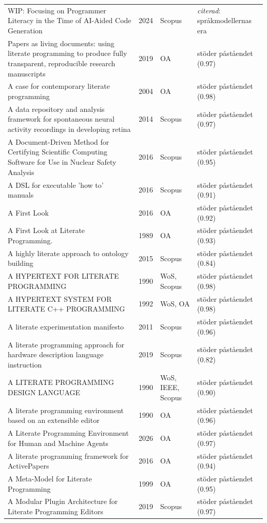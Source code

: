 \begin{longtable}{@{}%
  >{\raggedright\arraybackslash}p{}c%
  >{\raggedright\arraybackslash}p{}%
  >{\raggedright\arraybackslash}p{}@{}}
WIP: Focusing on Programmer Literacy in the Time of AI-Aided Code Generation & 2024 & Scopus & \emph{citerad}: språkmodellernas era \\
7 Papers as living documents: using literate programming to produce fully transparent, reproducible research manuscripts & 2019 & OA & stöder påståendet (0.97) \\
A case for contemporary literate programming & 2004 & OA & stöder påståendet (0.98) \\
A data repository and analysis framework for spontaneous neural activity recordings in developing retina & 2014 & Scopus & stöder påståendet (0.97) \\
A Document-Driven Method for Certifying Scientific Computing Software for Use in Nuclear Safety Analysis & 2016 & Scopus & stöder påståendet (0.95) \\
A DSL for executable 'how to' manuals & 2016 & Scopus & stöder påståendet (0.91) \\
A First Look & 2016 & OA & stöder påståendet (0.92) \\
A First Look at Literate Programming. & 1989 & OA & stöder påståendet (0.93) \\
A highly literate approach to ontology building & 2015 & Scopus & stöder påståendet (0.84) \\
A HYPERTEXT FOR LITERATE PROGRAMMING & 1990 & WoS, Scopus & stöder påståendet (0.98) \\
A HYPERTEXT SYSTEM FOR LITERATE C++ PROGRAMMING & 1992 & WoS, OA & stöder påståendet (0.98) \\
A literate experimentation manifesto & 2011 & Scopus & stöder påståendet (0.96) \\
A literate programming approach for hardware description language instruction & 2019 & Scopus & stöder påståendet (0.82) \\
A LITERATE PROGRAMMING DESIGN LANGUAGE & 1990 & WoS, IEEE, Scopus & stöder påståendet (0.90) \\
A literate programming environment based on an extensible editor & 1990 & OA & stöder påståendet (0.96) \\
A Literate Programming Environment for Human and Machine Agents & 2026 & OA & stöder påståendet (0.97) \\
A literate programming framework for ActivePapers & 2016 & OA & stöder påståendet (0.94) \\
A Meta-Model for Literate Programming & 1999 & OA & stöder påståendet (0.95) \\
A Modular Plugin Architecture for Literate Programming Editors & 2019 & Scopus & stöder påståendet (0.97) \\

\end{longtable}
